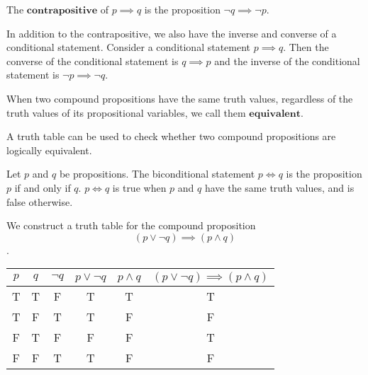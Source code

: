 \documentclass{article}
\newtheorem{definition}{Definition}[subsection]
\newtheorem{remark}{Remark}[subsection]
\newtheorem{idea}{Idea}[subsection]
\newtheorem{example}{Example}[subsection]
\begin{document}
\begin{tcolorbox}
[colback=blue!5!white,colframe=blue!75!black,title=\begin{definition}
\end{definition}]    
The $\textbf{contrapositive}$ of $p\implies q $ is the proposition $\neg q\implies \neg p$.
\end{tcolorbox}
\begin{tcolorbox}
[colback=cyan!5!white,colframe=cyan!75!black,title=\begin{remark}
\end{remark}]    
In addition to the contrapositive, we also have the inverse and converse of a conditional statement. Consider a conditional statement $p\implies q$. Then the converse of the conditional statement is $q\implies p$ and the inverse of the conditional statement is $\neg p\implies \neg q$. 
\end{tcolorbox}
\begin{tcolorbox}
[colback=blue!5!white,colframe=blue!75!black,title=\begin{definition}
\end{definition}]    
When two compound propositions have the same truth values, regardless of the truth values of its propositional variables, we call them $\textbf{equivalent}$.
\end{tcolorbox}
\begin{tcolorbox}
[colback=orange!5!white,colframe=orange!75!black,title=\begin{idea}
\end{idea}]
A truth table can be used to check whether two compound propositions are logically equivalent.
\end{tcolorbox}
\begin{tcolorbox}
[colback=blue!5!white,colframe=blue!75!black,title=\begin{definition}
\end{definition}]
Let $p$ and $q$ be propositions. The biconditional statement $p \iff q$ is the proposition $p$ if and only if $q$. $p \iff q$ is true when $p$ and $q$ have the same truth values, and is false otherwise.
\end{tcolorbox}
\begin{tcolorbox}
[colback=red!5!white,colframe=red!75!black,title=\begin{example}
\end{example}] 
We construct a truth table for the compound proposition $$(p\lor \neg q)\implies (p\wedge q)$$.
\end{tcolorbox}
\begin{table}[h]
      \centering
      \begin{tabular}{|c|c|c|c|c|c|}
      \hline
      $p$&$q$&$\neg q$&$p\lor\neg q$&$p\wedge q$&$(p\lor \neg q)\implies (p\wedge q)$\\ \hline
      T&T&F&T&T&T\\ \hline
      T&F&T&T&F&F\\ \hline
      F&T&F&F&F&T\\ \hline
      F&F&T&T&F&F\\ \hline
      \end{tabular}
\end{table}   
\end{document}
